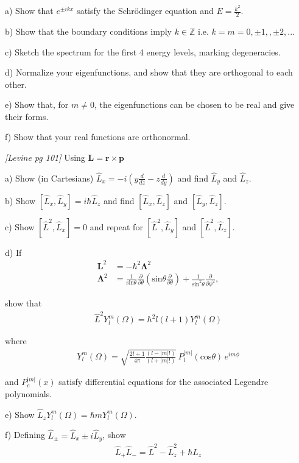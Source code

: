 a) Show that $e^{\pm ikx}$ satisfy the Schr{\"o}dinger equation and $E=\frac{k^2}{2}$.

b) Show that the boundary conditions imply
 $k\in\mathbb{Z}$ i.e. $k=m=0,\pm1,,\pm2,...$

c) Sketch the spectrum for the first 4 energy levels, marking degeneracies.

d) Normalize your eigenfunctions, and show that they are orthogonal to each other.

e) Show that, for $m\neq0$, the eigenfunctions can be chosen to be real
and give their forms.

f) Show that your real functions are orthonormal. 

\newpage
{}
{\em [Levine pg 101]}
Using $\mathbf{L} = \mathbf{r} \times \mathbf{p}$

a) Show (in Cartesians) $\hat{L}_x = -i(y\frac{d}{dz}-z\frac{d}{dy})$ and find
$\hat{L}_y$ and $\hat{L}_z$.

b) Show $[\hat{L}_x,\hat{L}_y]=i\hbar \hat{L}_z$ and find $[\hat{L}_x,\hat{L}_z]$
and $[\hat{L}_y,\hat{L}_z]$.

c) Show $[\hat{L}^2,\hat{L}_x] = 0$ and repeat for $[\hat{L}^2,\hat{L}_y]$
and $[\hat{L}^2,\hat{L}_z]$.

d) If
\begin{align*}
\mathbf{L}^2 & = -\hbar^2\mathbf{\Lambda}^2 \\
\mathbf{\Lambda}^2 & = \frac{1}{\text{sin}\theta} \frac{\partial}{\partial\theta}(\text{sin}\theta\frac{\partial}{\partial\theta})
            + \frac{1}{\text{sin}^2\theta}\frac{\partial}{\partial \phi^2},
\end{align*}

show that
\begin{align*}
\hat{L}^2Y^m_l(\Omega) = \hbar^2l(l+1)Y^m_l(\Omega)
\end{align*}

where
\begin{align*}
Y^m_l(\Omega) = \sqrt{\frac{2l+1}{4\pi}\frac{(l-|m|!)}{(l+|m|!)}}\,
            P^{|m|}_l(\text{cos}\theta)\, e^{im\phi}
\end{align*}

and $P^{|m|}_e(x)$ satisfy differential equations for the associated Legendre
polynomials.

e) Show $\hat{L}_zY^m_l(\Omega) = \hbar m Y^m_l(\Omega)$.

f) Defining $\hat{L}_{\pm} = \hat{L}_x \pm i\hat{L}_y$, show
\begin{align*}
\hat{L}_+\hat{L}_- = \hat{L}^2 - \hat{L}^2_z + \hbar\hat{L}_z
\end{align*}


